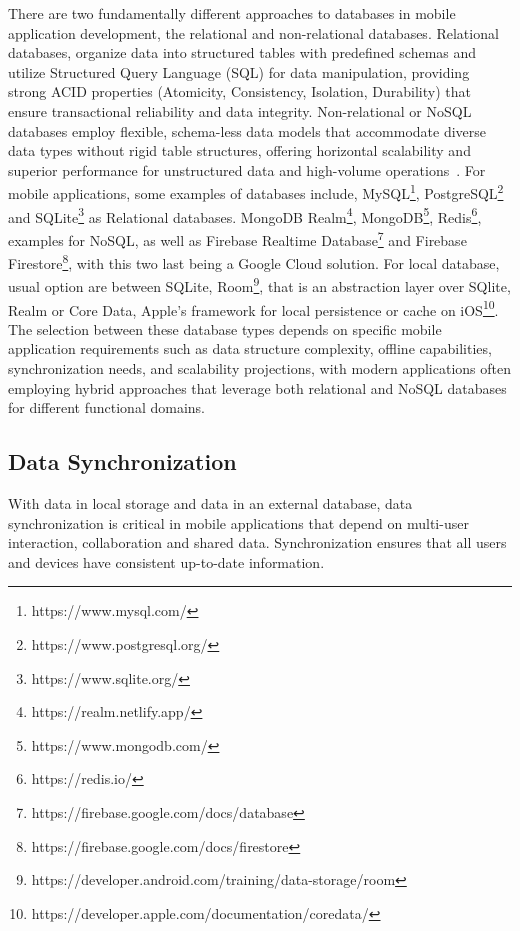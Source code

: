 There are two fundamentally different approaches to databases in mobile application development, the relational and non-relational databases.  Relational databases, organize data into structured tables with predefined schemas and utilize Structured Query Language (SQL) for data manipulation, providing strong ACID properties (Atomicity, Consistency, Isolation, Durability) that ensure transactional reliability and data integrity\cite{chiriac2025nosql}. Non-relational or NoSQL databases employ flexible, schema-less data models that accommodate diverse data types without rigid table structures, offering horizontal scalability and superior performance for unstructured data and high-volume operations~\cite{chiriac2025nosql}. For mobile applications, some examples of databases include, MySQL\footnote{https://www.mysql.com/}, PostgreSQL\footnote{https://www.postgresql.org/} and SQLite\footnote{https://www.sqlite.org/} as Relational databases. MongoDB Realm\footnote{https://realm.netlify.app/}, MongoDB\footnote{https://www.mongodb.com/}, Redis\footnote{https://redis.io/}, examples for NoSQL, as well as Firebase Realtime Database\footnote{https://firebase.google.com/docs/database} and Firebase Firestore\footnote{https://firebase.google.com/docs/firestore}, with this two last being a Google Cloud solution. For local database, usual option are between SQLite, Room\footnote{https://developer.android.com/training/data-storage/room}, that is an abstraction layer over SQlite, Realm or Core Data, Apple's framework for local persistence or cache on iOS\footnote{https://developer.apple.com/documentation/coredata/}. The selection between these database types depends on specific mobile application requirements such as data structure complexity, offline capabilities, synchronization needs, and scalability projections, with modern applications often employing hybrid approaches that leverage both relational and NoSQL databases for different functional domains\cite{Taipalus2024}.


\subsection{Data Synchronization}\label{subsec:sync}

With data in local storage and data in an external database, data synchronization is critical in mobile applications that depend on multi-user interaction, collaboration and shared data. Synchronization ensures that all users and devices have consistent up-to-date information.

